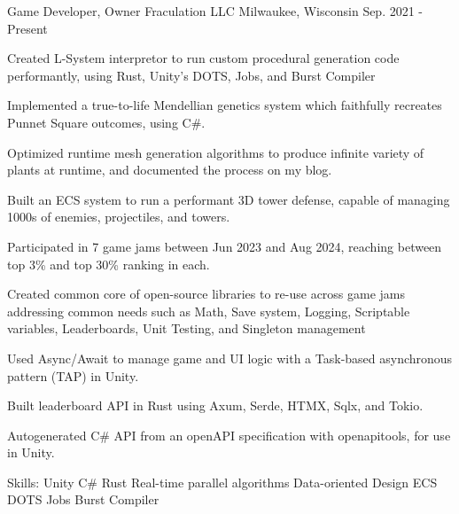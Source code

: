 \begin{cventries}
\cventry
{Game Developer, Owner} %
{Fraculation LLC} %
{Milwaukee, Wisconsin} %
{Sep. 2021 - Present} %
{
  \begin{cvitems} %
    \item {Created L-System interpretor to run custom procedural generation code performantly, using Rust, Unity's DOTS, Jobs, and Burst Compiler}
    \item {Implemented a true-to-life Mendellian genetics system which faithfully recreates Punnet Square outcomes, using C\#.}
    \item {Optimized runtime mesh generation algorithms to produce infinite variety of plants at runtime, and documented the process on my blog.}
    \item {Built an ECS system to run a performant 3D tower defense, capable of managing 1000s of enemies, projectiles, and towers.}
    \item {Participated in 7 game jams between Jun 2023 and Aug 2024, reaching between top 3\% and top 30\% ranking in each.}
    \item {Created common core of open-source libraries to re-use across game jams addressing common needs such as Math, Save system, Logging, Scriptable variables, Leaderboards, Unit Testing, and Singleton management }
    \item {Used Async/Await to manage game and UI logic with a Task-based asynchronous pattern (TAP) in Unity.}
    \item {Built leaderboard API in Rust using Axum, Serde, HTMX, Sqlx, and Tokio.}
    \item {Autogenerated C\# API from an openAPI specification with openapitools, for use in Unity.}
    \item {Skills: Unity \textbullet{} C\# \textbullet{} Rust \textbullet{} Real-time parallel algorithms \textbullet{} Data-oriented Design \textbullet{} ECS \textbullet{} DOTS \textbullet{} Jobs \textbullet{} Burst Compiler}
  \end{cvitems}
}


\end{cventries}
